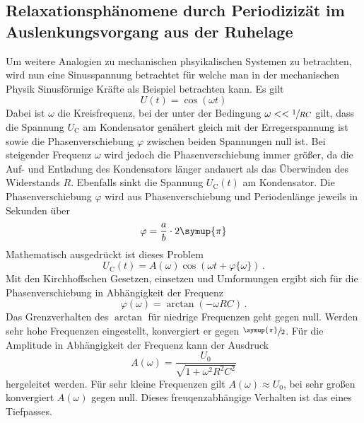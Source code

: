 \subsection{Relaxationsphänomene durch Periodizizät im Auslenkungsvorgang 
aus der Ruhelage}
Um weitere Analogien zu mechanischen phsyikalischen Systemen zu betrachten,
wird nun eine Sinusspannung betrachtet für welche man in der mechanischen 
Physik Sinusförmige Kräfte als Beispiel betrachten kann. Es gilt
\begin{equation}
    U(t)=\cos(\omega t)
\end{equation}
Dabei ist $\omega$ die Kreisfrequenz, bei der unter der Bedingung $\omega<<\sfrac{1}{RC}$
gilt, dass die Spannung $U_\text{C}$ am Kondensator genähert gleich mit der Erregerspannung ist
sowie die Phasenverschiebung $\varphi$ zwischen beiden Spannungen null ist.
Bei steigender Frequenz $\omega$ wird jedoch die Phasenverschiebung immer größer,
da die Auf- und Entladung des Kondensators länger andauert als das Überwinden des
Widerstands $R$. Ebenfalls sinkt die Spannung $U_\text{C}(t)$ am Kondensator.
Die Phasenverschiebung $\varphi$ wird aus Phasenverschiebung und Periodenlänge
jeweils in Sekunden über 
\begin{equation}
    \varphi=\frac{a}{b}\cdot2\symup{\pi}
    \label{eq:Phasenverschiebung}
\end{equation}
Mathematisch ausgedrückt ist dieses Problem 
\begin{equation}
    U_\text{C}(t)=A(\omega)\cos(\omega t+\varphi\{\omega\})\,.
\end{equation}
Mit den Kirchhoffschen Gesetzen, einsetzen und Umformungen ergibt sich für die Phasenverschiebung
in Abhängigkeit der Frequenz
\begin{equation}
    \varphi(\omega)=\arctan(-\omega RC)\,.
\end{equation}
Das Grenzverhalten des $\arctan$ für niedrige Frequenzen geht gegen null.
Werden sehr hohe Frequenzen eingestellt, konvergiert er gegen $\sfrac{\symup{\pi}}{2}$.
Für die Amplitude in Abhängigkeit der Frequenz kann der Ausdruck
\begin{equation}
    A(\omega)=\frac{U_0}{\sqrt{1+\omega^2R^2C^2}}
    \label{eq:arctan}
\end{equation}
hergeleitet werden. Für sehr kleine Frequenzen gilt $A(\omega)\approx U_0$, bei sehr großen
konvergiert $A(\omega)$ gegen null. Dieses freuqenzabhängige Verhalten ist das eines
Tiefpasses.

